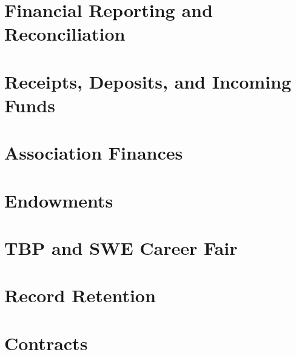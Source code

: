 \documentclass{article}
\begin{document}
\section{Financial Reporting and Reconciliation} \label{VII}


\section{Receipts, Deposits, and Incoming Funds} \label{VIII}


\section{Association Finances} \label{IX}


\section{Endowments} \label{X}


\section{TBP and SWE Career Fair} \label{XI}


\section{Record Retention} \label{XII}


\section{Contracts} \label{XIII}

\end{document}
